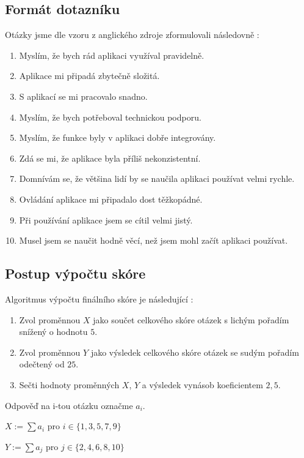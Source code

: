 \documentclass[12pt,a4paper]{report}
\begin{document}
\subsection{Formát dotazníku}
Otázky jsme dle vzoru z anglického zdroje zformulovali následovně \citep{sus-adobe}:

\begin{enumerate}
    \item Myslím, že bych rád aplikaci využíval pravidelně.
    \item Aplikace mi připadá zbytečně složitá.
    \item S aplikací se mi pracovalo snadno.
    \item Myslím, že bych potřeboval technickou podporu.
    \item Myslím, že funkce byly v aplikaci dobře integrovány.
    \item Zdá se mi, že aplikace byla příliš nekonzistentní.
    \item Domnívám se, že většina lidí by se naučila aplikaci používat velmi rychle.
    \item Ovládání aplikace mi připadalo dost těžkopádné.
    \item Při používání aplikace jsem se cítil velmi jistý.
    \item Musel jsem se naučit hodně věcí, než jsem mohl začít aplikaci používat.
\end{enumerate}

\subsection{Postup výpočtu skóre}

Algoritmus výpočtu finálního skóre je následující \citep{sus-adobe}:

\begin{enumerate}
    \item Zvol proměnnou $X$ jako součet celkového skóre otázek s lichým pořadím snížený o hodnotu $5$.
    \item Zvol proměnnou $Y$ jako výsledek celkového skóre otázek se sudým pořadím odečtený od $25$.
    \item Sečti hodnoty proměnných $X$, $Y$ a výsledek vynásob koeficientem $2,5$.
\end{enumerate}

Odpověď na i-tou otázku označme $a_i$.

$X := \sum a_i$ pro $i \in \{1,3,5,7,9\}$

$Y := \sum a_j$ pro $j \in \{2,4,6,8,10\}$
\end{document}
